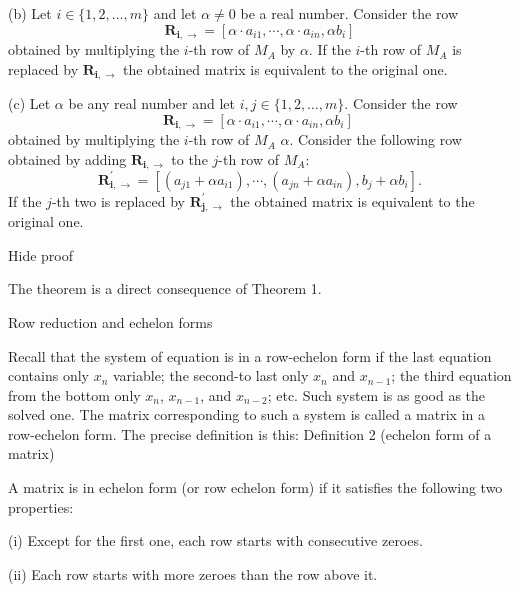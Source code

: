     (b) Let \( i\in\{1,2,\dots, m\} \) and let \( \alpha\neq 0 \) be a real number. Consider the row \[ \mathbf{R_{i,\rightarrow}}=\left[\alpha\cdot a_{i1},\cdots,\alpha\cdot a_{in} , \alpha b_i\right]\] obtained by multiplying the \( i \)-th row of \( M_A \) by \( \alpha \). If the \( i \)-th row of \( M_A \) is replaced by \( \mathbf{R_{i,\rightarrow}} \) the obtained matrix is equivalent to the original one.

    (c) Let \( \alpha \) be any real number and let \( i,j\in\{1,2,\dots, m\} \). Consider the row \[ \mathbf{R_{i,\rightarrow}}=\left[\alpha\cdot a_{i1},\cdots,\alpha\cdot a_{in},\alpha b_i\right]\ \] obtained by multiplying the \( i \)-th row of \( M_A \) \( \alpha \). Consider the following row obtained by adding \( \mathbf{R_{i,\rightarrow}} \) to the \( j \)-th row of \( M_A \): \[ \mathbf{R^{\prime}_{i,\rightarrow}}=\left[\left(a_{j1}+\alpha a_{i1}\right),\cdots,\left(a_{jn}+\alpha a_{in}\right),b_j+\alpha b_i\right] .\] If the \( j \)-th two is replaced by \( \mathbf{R^{\prime}_{j,\rightarrow}} \) the obtained matrix is equivalent to the original one.

Hide proof

The theorem is a direct consequence of Theorem 1.

Row reduction and echelon forms

Recall that the system of equation is in a row-echelon form if the last equation contains only \( x_n \) variable; the second-to last only \( x_n \) and \( x_{n-1} \); the third equation from the bottom only \( x_n \), \( x_{n-1} \), and \( x_{n-2} \); etc. Such system is as good as the solved one. The matrix corresponding to such a system is called a matrix in a row-echelon form. The precise definition is this:
Definition 2 (echelon form of a matrix)


A matrix is in echelon form (or row echelon form) if it satisfies the following two properties:

    (i) Except for the first one, each row starts with consecutive zeroes.

    (ii) Each row starts with more zeroes than the row above it.

